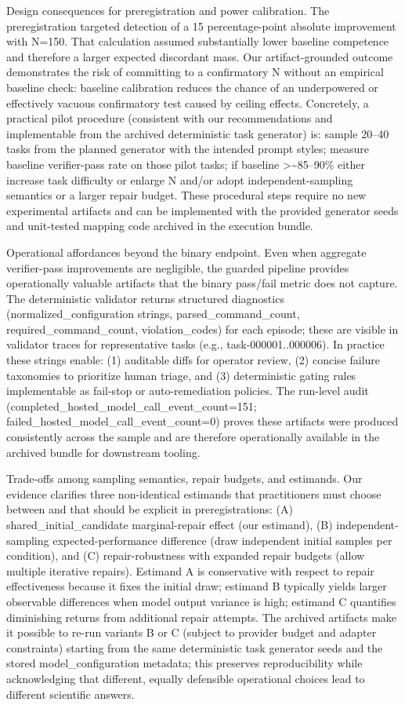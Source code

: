 \documentclass[conference]{IEEEtran}
\begin{document}
Design consequences for preregistration and power calibration. The preregistration targeted detection of a 15 percentage-point absolute improvement with N=150. That calculation assumed substantially lower baseline competence and therefore a larger expected discordant mass. Our artifact-grounded outcome demonstrates the risk of committing to a confirmatory N without an empirical baseline check: baseline calibration reduces the chance of an underpowered or effectively vacuous confirmatory test caused by ceiling effects. Concretely, a practical pilot procedure (consistent with our recommendations and implementable from the archived deterministic task generator) is: sample 20--40 tasks from the planned generator with the intended prompt styles; measure baseline verifier-pass rate on those pilot tasks; if baseline >\textasciitilde{}85--90\% either increase task difficulty or enlarge N and/or adopt independent-sampling semantics or a larger repair budget. These procedural steps require no new experimental artifacts and can be implemented with the provided generator seeds and unit-tested mapping code archived in the execution bundle.

Operational affordances beyond the binary endpoint. Even when aggregate verifier-pass improvements are negligible, the guarded pipeline provides operationally valuable artifacts that the binary pass/fail metric does not capture. The deterministic validator returns structured diagnostics (normalized\_configuration strings, parsed\_command\_count, required\_command\_count, violation\_codes) for each episode; these are visible in validator traces for representative tasks (e.g., task-000001..000006). In practice these strings enable: (1) auditable diffs for operator review, (2) concise failure taxonomies to prioritize human triage, and (3) deterministic gating rules implementable as fail-stop or auto-remediation policies. The run-level audit (completed\_hosted\_model\_call\_event\_count=151; failed\_hosted\_model\_call\_event\_count=0) proves these artifacts were produced consistently across the sample and are therefore operationally available in the archived bundle for downstream tooling.

Trade-offs among sampling semantics, repair budgets, and estimands. Our evidence clarifies three non-identical estimands that practitioners must choose between and that should be explicit in preregistrations: (A) shared\_initial\_candidate marginal-repair effect (our estimand), (B) independent-sampling expected-performance difference (draw independent initial samples per condition), and (C) repair-robustness with expanded repair budgets (allow multiple iterative repairs). Estimand A is conservative with respect to repair effectiveness because it fixes the initial draw; estimand B typically yields larger observable differences when model output variance is high; estimand C quantifies diminishing returns from additional repair attempts. The archived artifacts make it possible to re-run variants B or C (subject to provider budget and adapter constraints) starting from the same deterministic task generator seeds and the stored model\_configuration metadata; this preserves reproducibility while acknowledging that different, equally defensible operational choices lead to different scientific answers.
\end{document}
